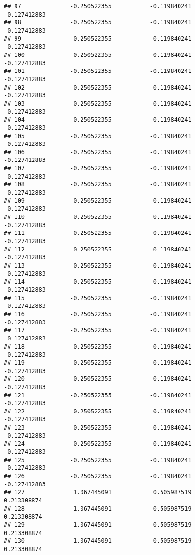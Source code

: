 \documentclass[]{article}
\begin{document}
\begin{verbatim}
## 97              -0.250522355           -0.119840241           -0.127412883
## 98              -0.250522355           -0.119840241           -0.127412883
## 99              -0.250522355           -0.119840241           -0.127412883
## 100             -0.250522355           -0.119840241           -0.127412883
## 101             -0.250522355           -0.119840241           -0.127412883
## 102             -0.250522355           -0.119840241           -0.127412883
## 103             -0.250522355           -0.119840241           -0.127412883
## 104             -0.250522355           -0.119840241           -0.127412883
## 105             -0.250522355           -0.119840241           -0.127412883
## 106             -0.250522355           -0.119840241           -0.127412883
## 107             -0.250522355           -0.119840241           -0.127412883
## 108             -0.250522355           -0.119840241           -0.127412883
## 109             -0.250522355           -0.119840241           -0.127412883
## 110             -0.250522355           -0.119840241           -0.127412883
## 111             -0.250522355           -0.119840241           -0.127412883
## 112             -0.250522355           -0.119840241           -0.127412883
## 113             -0.250522355           -0.119840241           -0.127412883
## 114             -0.250522355           -0.119840241           -0.127412883
## 115             -0.250522355           -0.119840241           -0.127412883
## 116             -0.250522355           -0.119840241           -0.127412883
## 117             -0.250522355           -0.119840241           -0.127412883
## 118             -0.250522355           -0.119840241           -0.127412883
## 119             -0.250522355           -0.119840241           -0.127412883
## 120             -0.250522355           -0.119840241           -0.127412883
## 121             -0.250522355           -0.119840241           -0.127412883
## 122             -0.250522355           -0.119840241           -0.127412883
## 123             -0.250522355           -0.119840241           -0.127412883
## 124             -0.250522355           -0.119840241           -0.127412883
## 125             -0.250522355           -0.119840241           -0.127412883
## 126             -0.250522355           -0.119840241           -0.127412883
## 127              1.067445091            0.505987519            0.213308874
## 128              1.067445091            0.505987519            0.213308874
## 129              1.067445091            0.505987519            0.213308874
## 130              1.067445091            0.505987519            0.213308874

\end{verbatim}
\end{document}
